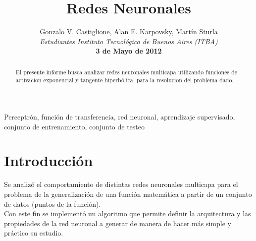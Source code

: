 \documentclass[%
    final,
    reprint,
    notitlepage,
    narroweqnarray,
    inline,
    twoside,
    invited
    ]{ieee}
\begin{document}
\title[Redes Neuronales]{%
       Redes Neuronales}

\author[Castiglione, Karpovsky, Sturla]{Gonzalo V. Castiglione, Alan E. Karpovsky, Martín Sturla\\\textit{Estudiantes 
       Instituto Tecnológico de Buenos Aires (ITBA)}\\
\textbf{3 de Mayo de 2012}
}


\lognumber{}
\pubitemident{}


\maketitle               

\begin{abstract} 
El presente informe busca analizar redes neuronales multicapa utilizando funciones de activacion exponencial y tangente hiperbólica, 
para la resolucion del problema dado.

\end{abstract}

\begin{keywords}
Perceptrón, función de transferencia, red neuronal, aprendizaje supervisado, conjunto de entrenamiento, conjunto de testeo
\end{keywords}

\section{Introducción}

\par Se analizó el comportamiento de distintas redes neuronales multicapa para el problema de la generalización 
de una función matemática a partir de un conjunto de datos (puntos de la función).\\
Con este fin se implementó un algoritmo que permite definir la arquitectura y las propiedades de la red neuronal 
a generar de manera de hacer más simple y práctico su estudio. \\
\end{document}
